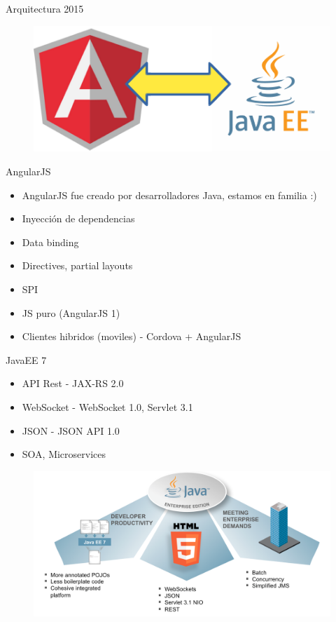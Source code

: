 \documentclass{beamer}
\begin{document}
\begin{frame}{Arquitectura 2015}
	\begin{figure}
\centering
\includegraphics[width=0.8\linewidth]{Images/anguaree.png}
\end{figure}
\end{frame}

\begin{frame}{AngularJS}
	\begin{itemize}
		\item AngularJS fue creado por desarrolladores Java, estamos en familia :) \footnotemark[1]
		\item Inyección de dependencias
		\item Data binding
		\item Directives, partial layouts
		\item SPI
		\item JS puro (AngularJS 1)
		\item Clientes hibridos (moviles) - Cordova + AngularJS
	\end{itemize}
\end{frame}

\begin{frame}{JavaEE 7}
	\begin{itemize}
		\item API Rest - JAX-RS 2.0
		\item WebSocket - WebSocket 1.0, Servlet 3.1
		\item JSON - JSON API 1.0
		\item SOA, Microservices
	\end{itemize}
	\begin{figure}
\centering
\includegraphics[width=0.7\linewidth]{Images/javaee7-theme}
\end{figure}

\end{frame}
\end{document}
